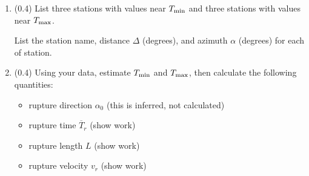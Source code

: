 \documentclass[11pt,titlepage,fleqn]{article}
\begin{document}
\begin{enumerate}
\begin{enumerate}
\begin{itemize}
\item Use stations within the epicentral distances given by $30^\circ < \Delta < 85^\circ$. (You will only find this detail in the Supplement of \citet{Ni2005}). You may need to delete any previously saved data files, if you are seeing stations having epicentral distances outside of the desired range.

\item Use at least 10 stations with high-quality seismograms. (Think about what stations would be needed to reproduce the plot in \citet{Ni2005}. Be sure to include CAN from before.)

\item See the example in \verb+lab_record_section.ipynb+ for how to align seismograms on the predicted P wave onset time.
\end{itemize}

\item (0.2) What are the minimum and maximum time shifts applied to your seismograms in order to align them?

\item (0.4) Create a new record section that contains envelopes, similar to what is shown in \citet[][Figure~1d]{Ni2005}.

See \verb+hwsol_sumatraA.pdf+ for lines of code. This will also require you to provide appropriately modified streams to pysep's record section plotting tool.

\end{enumerate}


\item (0.4) List three stations with values near $T_{\rm min}$ and three stations with values near $T_{\rm max}$.

List the station name, distance $\Delta$ (degrees), and azimuth $\alpha$ (degrees) for each of station.



\item (0.4) Using your data, estimate $T_{\rm min}$ and $T_{\rm max}$, then calculate the following quantities:
%
\begin{itemize}
\item rupture direction $\alpha_0$ (this is inferred, not calculated)
\item rupture time $\overline{T}_r$ (show work)
\item rupture length $L$ (show work)
\item rupture velocity $v_r$ (show work)
\end{itemize}

\end{enumerate}
\end{document}

